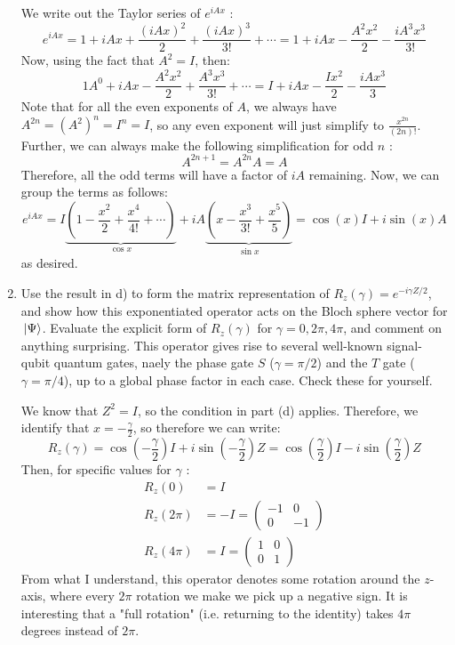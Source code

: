 \documentclass[10pt]{article}
\begin{document}
\begin{enumerate}[label=\alph*)]
			\begin{solution}
				We write out the Taylor series of \( e^{iAx} \) :
				\[
				e^{iAx} = 1 + iAx + \frac{(iAx)^2}{2} + \frac{(iAx)^3}{3!} + \cdots = 1 + iAx - \frac{A^2 x^2}{2} - \frac{iA^3 x^3}{3!}
				\] 
				Now, using the fact that \( A^2 = I \), then:
				\[
				1A^{0} + iAx - \frac{A^2x^2}{2} + \frac{A^3x^3}{3!} + \cdots = I + iAx - \frac{Ix^2}{2} - \frac{iA x^3}{3}
				\] 
				Note that for all the even exponents of \( A \), we always have \( A^{2n} = (A^2)^{n} = I^{n} = I \),
				so any even exponent 
				will just simplify to \( \frac{x^{2n}}{(2n)!} \).
				Further, we can always make the following simplification for odd \( n \) :
				\[
				A^{2n + 1} = A^{2n} A = A
				\] 
				Therefore, all the odd terms will have a factor of \( iA \) remaining. Now, we can group the terms 
				as follows:
				\[
					e^{iAx} = I \underbrace{\left(1 - \frac{x^2}{2} + \frac{x^{4}}{4!} + \cdots \right)}_{\cos x} +
					iA\underbrace{\left(x - \frac{x^3}{3!} + \frac{x^{5}}{5}\right)}_{\sin x} 
					= \cos(x) I+ i \sin(x) A
				\] 
				as desired. 
			\end{solution}
		\item Use the result in d) to form the matrix representation of \( R_z(\gamma) = e^{-i \gamma Z / 2} \), and 
			show how this exponentiated operator acts on the Bloch sphere vector for \( \ket*{\Psi} \). 
			Evaluate the explicit form of \( R_z(\gamma) \) for \( \gamma = 0, 2\pi, 4\pi \), and comment 
			on anything surprising. This operator gives rise to several well-known signal-qubit quantum gates, 
			naely the phase gate \( S \) (\( \gamma = \pi / 2 \)) and the \( T \) gate (\( \gamma = \pi / 4 \)), up to 
			a global phase factor in each case. Check these for yourself. 

			\begin{solution}
				We know that \( Z^2 = I \), so the condition in part (d) applies. Therefore, we identify that 
				 \( x = -\frac{\gamma}{2}\), so therefore we can write:
				 \[
					R_z(\gamma) = \cos(-\frac{\gamma}{2}) I + i \sin(-\frac{\gamma}{2})Z = \cos(\frac{\gamma}{2})I
					- i \sin(\frac{\gamma}{2})Z
				 \] 
				 Then, for specific values for \( \gamma \) :
				 \begin{align*}
					 R_z(0) &= I\\
					 R_z(2\pi) &= -I = \begin{pmatrix} -1 &0\\ 0 & -1 \end{pmatrix} \\
					 R_z(4\pi) &= I = \begin{pmatrix} 1 &0\\0 & 1 \end{pmatrix} 
				 \end{align*}
				 From what I understand, this operator denotes some rotation around the \( z \)-axis, 
				 where every \( 2\pi \) rotation we make we pick up a negative sign. It is interesting that 
				 a "full rotation" (i.e. returning to the identity) takes \( 4\pi \) degrees instead of 
				 \( 2\pi \). 


\end{solution}
\end{enumerate}
\end{document}
